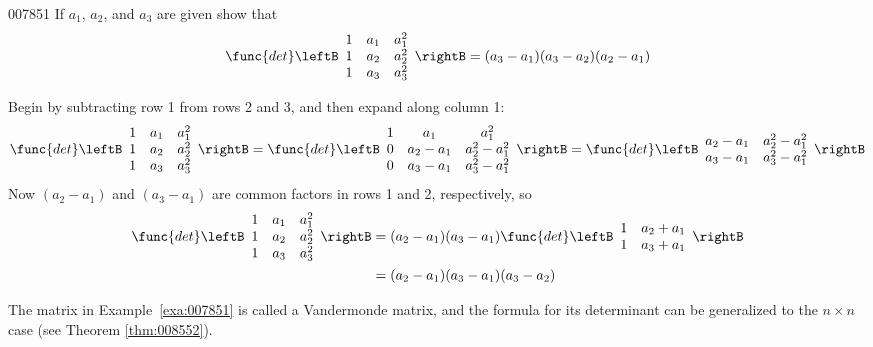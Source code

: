 \begin{example}{}{007851}
If $a_1$, $a_2$, and $a_3$ are given show that
\begin{equation*}
\func{det}\leftB \begin{array}{ccc}
1 & a_1 & a_1^2 \\
1 & a_2 & a_2^2 \\
1 & a_3 & a_3^2 
\end{array}
\rightB = (a_3-a_1)(a_3-a_2)(a_2-a_1)
\end{equation*}
\begin{solution}
Begin by subtracting row 1 from rows 2 and 3, and then expand along column 1:
\begin{equation*}
\func{det} \leftB \begin{array}{ccc}
1 & a_1 & a_1^2 \\
1 & a_2 & a_2^2 \\
1 & a_3 & a_3^2 
\end{array}
\rightB = \func{det} \leftB \begin{array}{ccc}
1 & a_1 & a_1^2 \\
0 & a_2-a_1 & a_2^2-a_1^2 \\
0 & a_3-a_1 & a_3^2-a_1^2
\end{array}
\rightB
= \func{det} \leftB \begin{array}{cc}
a_2-a_1 & a_2^2-a_1^2 \\
a_3-a_1 & a_3^2-a_1^2  
\end{array}
\rightB
\end{equation*}
Now $(a_2 - a_1)$ and $(a_3 - a_1)$ are common factors in rows 1 and 2, respectively, so
\begin{align*}
\func{det} \leftB \begin{array}{ccc}
1 & a_1 & a_1^2 \\
1 & a_2 & a_2^2 \\
1 & a_3 & a_3^2 
\end{array}
\rightB &= (a_2-a_1)(a_3-a_1)\func{det} \leftB \begin{array}{cc}
1& a_2+a_1 \\
1 & a_3+a_1
\end{array} \rightB \\
&= (a_2-a_1)(a_3-a_1)(a_3-a_2)
\end{align*}
\end{solution}
\end{example}

\noindent The matrix in Example~\ref{exa:007851} is called a Vandermonde matrix, and the formula for its determinant can be generalized to the $n \times n$ case (see Theorem \ref{thm:008552}).


